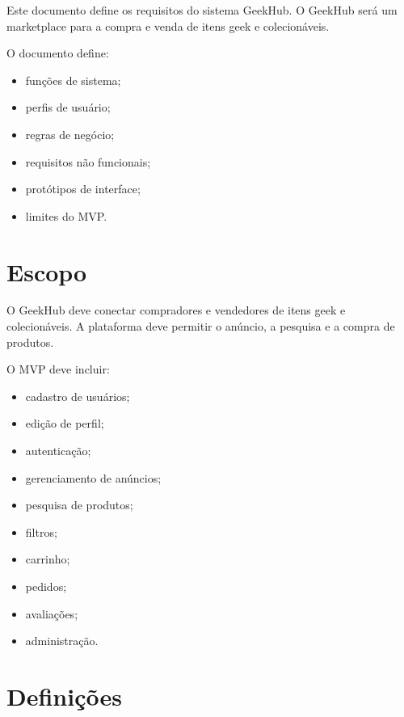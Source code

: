 \documentclass{scrreprt}
\newenvironment{fieldlist}
	{\renewcommand{\labelitemi}{--}\begin{itemize}}
	{\end{itemize}}
\begin{document}
Este documento define os requisitos do sistema GeekHub. O GeekHub será um
marketplace para a compra e venda de itens geek e colecionáveis.

O documento define:
\begin{fieldlist}
	\item funções de sistema;
	\item perfis de usuário;
	\item regras de negócio;
	\item requisitos não funcionais;
	\item protótipos de interface;
	\item limites do MVP.
\end{fieldlist}

\section{Escopo}

O GeekHub deve conectar compradores e vendedores de itens geek e colecionáveis.
A plataforma deve permitir o anúncio, a pesquisa e a compra de produtos.

O MVP deve incluir:
\begin{fieldlist}
	\item cadastro de usuários;
	\item edição de perfil;
	\item autenticação;
	\item gerenciamento de anúncios;
	\item pesquisa de produtos;
	\item filtros;
	\item carrinho;
	\item pedidos;
	\item avaliações;
	\item administração.
\end{fieldlist}

\section{Definições}
\end{document}
